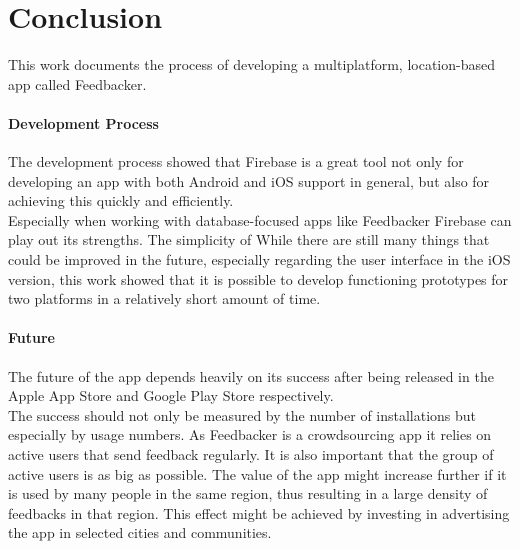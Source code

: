 \section{Conclusion}
This work documents the process of developing a multiplatform, location-based app called Feedbacker.\\
\paragraph{Development Process}
The development process showed that Firebase is a great tool not only for developing an app with both Android and iOS support in general, but also for achieving this quickly and efficiently.\\
Especially when working with database-focused apps like Feedbacker Firebase can play out its strengths. The simplicity of
While there are still many things that could be improved in the future, especially regarding the user interface in  the iOS version, this work showed that it is possible to develop functioning prototypes for two platforms in a relatively short amount of time.

\paragraph{Future}
The future of the app depends heavily on its success after being released in the Apple App Store and Google Play Store respectively.\\
The success should not only be measured by the number of installations but especially by usage numbers. As Feedbacker is a crowdsourcing app it relies on active users that send feedback regularly. It is also important that the group of active users is as big as possible. The value of the app might increase further if it is used by many people in the same region, thus resulting in a large density of feedbacks in that region. This effect might be achieved by investing in advertising the app in selected cities and communities.\\
